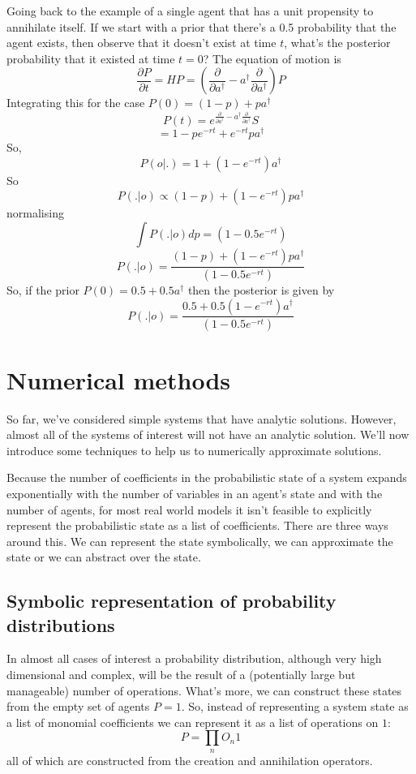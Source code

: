 \documentclass[letterpaper,twocolumn,10pt]{article}
\begin{document}
Going back to the example of a single agent that has a unit propensity to annihilate itself. If we start with a prior that there's a 0.5 probability that the agent exists, then observe that it doesn't exist at time $t$, what's the posterior probability that it existed at time $t=0$? The equation of motion is
\[
\frac{\partial P}{\partial t} = HP = \left(\frac{\partial}{\partial a^\dag} - a^\dag \frac{\partial }{\partial a^\dag}\right)P
\]
Integrating this for the case $P(0) = (1-p) + pa^\dag$
\[
P(t) = e^{\frac{\partial}{\partial a^\dag} - a^\dag \frac{\partial }{\partial a^\dag}}S
\]
\[
= 1-pe^{-rt} + e^{-rt}pa^\dag
\]
So,
\[
P(o|.) = 1 + (1-e^{-rt})a^\dag
\]
So
\[
P(.|o) \propto (1-p) + (1-e^{-rt})pa^\dag
\]
normalising
\[
\int P(.|o) dp = (1-0.5e^{-rt})
\]
\[
P(.|o) = \frac{(1-p) + (1-e^{-rt})pa^\dag}{(1-0.5e^{-rt})}
\]
So, if the prior $P(0) = 0.5 + 0.5a^\dag$ then the posterior is given by
\[
P(.|o) = \frac{0.5 + 0.5(1-e^{-rt})a^\dag}{(1-0.5e^{-rt})}
\]

\section{Numerical methods}

So far, we've considered simple systems that have analytic solutions. However, almost all of the systems of interest will not have an analytic solution. We'll now introduce some techniques to help us to numerically approximate solutions.

Because the number of coefficients in the probabilistic state of a system expands exponentially with the number of variables in an agent's state and with the number of agents, for most real world models it isn't feasible to explicitly represent the probabilistic state as a list of coefficients. There are three ways around this. We can represent the state symbolically, we can approximate the state or we can abstract over the state.

\subsection{Symbolic representation of probability distributions}

In almost all cases of interest a probability distribution, although very high dimensional and complex, will be the result of a (potentially large but manageable) number of operations. What's more, we can construct these states from the empty set of agents $P=1$. So, instead of representing a system state as a list of monomial coefficients we can represent it as a list of operations on $1$:
\[
P = \prod_n O_n1
\]
all of which are constructed from the creation and annihilation operators.
\end{document}
